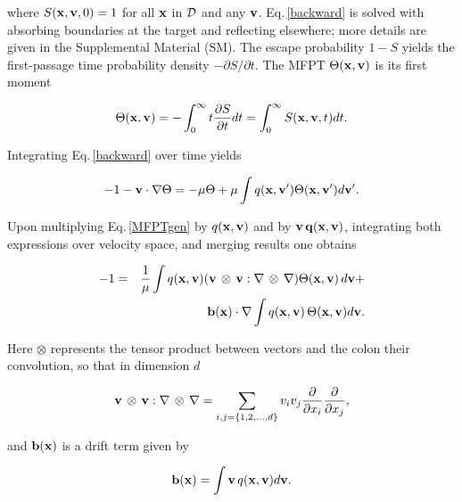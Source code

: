 \documentclass[
 reprint,










 amsmath,amssymb,
 aps, prl,






longbibliography
]{revtex4-2}
\begin{document}
where $S({\bf {x}}, {\bf {v}}, 0) =1$ for all ${\bf {x}}$ in $\cal{D}$ and any $\bf v$.
Eq.\,\ref{backward} is solved with
absorbing boundaries at the
target and reflecting elsewhere; more details are
given in the Supplemental Material (SM).
The escape probability $1 - S$ yields the first-passage time probability density
 $-{\partial S}/ {\partial t}$. The MFPT $\Theta({\bf {x}}, {\bf {v}})$ is its first moment

\begin{equation}
\label{moment}
\Theta({\bf {x}}, {\bf {v}}) = - \int_{0}^{\infty} t \frac{\partial S} {\partial t} dt =  \int_{0}^{\infty} S( {\bf {x}}, {\bf {v}}, t) dt.
\end{equation}

Integrating Eq.\,\ref{backward} over time yields

\begin{equation}
\label{MFPTgen}
-1  - {\bf {v}} \cdot  \nabla \Theta = - \mu \Theta +  \mu \int q({\bf {x}},{\bf {v}}') \Theta({\bf {x}}, {\bf {v}}') d {\bf {v}}'.
\end{equation}

Upon multiplying Eq.\,\ref{MFPTgen} by $q({\bf {x}}, {\bf {v}})$ and
by $\bf {v} \, q({\bf {x}}, {\bf {v}})$,  integrating both expressions
over velocity space, and merging results one obtains

\begin{eqnarray}
\nonumber
-1 &=& \frac{1}{\mu} \int q({\bf {x}}, {\bf {v}}) ({\bf {v}}  \, \otimes \, {\bf {v}} :
\nabla \, \otimes \, \nabla) \Theta({\bf {x}}, {\bf {v}})  \, d {\bf {v}} + \\
\label{MFPT}
&&  {\bf {b}}( {\bf {x}})\cdot {\nabla} \int q({\bf {x}}, {\bf {v}}) \,\Theta ({\bf {x}}, {\bf {v}}) d {\bf {v}}.
\end{eqnarray}

Here $\otimes$ represents the tensor product
between vectors and the colon their convolution, so that
in dimension $d$

\begin{eqnarray}
\nonumber
{\bf {v}}  \, \otimes \, {\bf {v}} :
\nabla \, \otimes \, \nabla =  \sum_{i,j = \{1,2, \dots, d \}} v_i v_j \frac{\partial}{\partial{x_i}} \frac{\partial}{\partial{x_j}},
\end{eqnarray}

and ${\bf {b}} ({\bf {x}})$ is a drift term given by

\begin{eqnarray}
\label{drift}
{\bf {b}} ({\bf {x}}) = \int {\bf {v}} \, q({\bf {x}}, {\bf {v}}) d {\bf {v}}.
\end{eqnarray}
\end{document}
